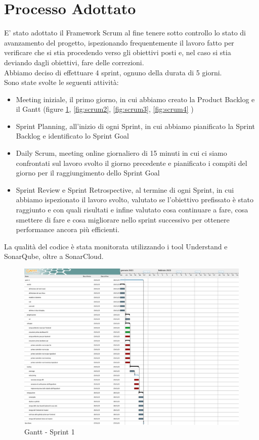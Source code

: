 \documentclass[a4paper,12pt]{report}
\begin{document}
\newpage
    	\section{Processo Adottato}	
	E' stato adottato il Framework Scrum al fine tenere sotto controllo lo stato di avanzamento del progetto, ispezionando frequentemente il lavoro fatto per verificare che si stia procedendo verso gli obiettivi posti e, nel caso si stia deviando dagli obiettivi, fare delle correzioni. \\
Abbiamo deciso di effettuare 4 sprint, ognuno della durata di 5 giorni.\\
Sono state svolte le seguenti attività:
	\begin{itemize}
		\item Meeting iniziale, il primo giorno, in cui abbiamo creato la Product Backlog e il Gantt (figure \ref{fig:scrum1}, \ref{fig:scrum2}, \ref{fig:scrum3}, \ref{fig:scrum4} )
		\item	Sprint Planning, all’inizio di ogni Sprint, in cui abbiamo pianificato la Sprint Backlog e identificato lo Sprint Goal
		\item Daily Scrum, meeting online giornaliero di 15 minuti in cui ci siamo confrontati sul lavoro svolto il giorno precedente e pianificato i compiti del giorno per il raggiungimento dello Sprint Goal
		\item Sprint Review e Sprint Retrospective, al termine di ogni Sprint, in cui abbiamo ispezionato il lavoro svolto, valutato se l’obiettivo prefissato è stato raggiunto e con quali risultati e infine valutato cosa continuare a fare, cosa smettere di fare e cosa migliorare nello sprint successivo per ottenere performance ancora più efficienti.
	\end{itemize}
La qualità del codice è stata monitorata utilizzando i tool Understand e SonarQube, oltre a SonarCloud.	

	\begin{figure}[!h]
		\centering
		\includegraphics[width=0.9\linewidth]{image/scrum1.png}
		\caption{Gantt - Sprint 1}\label{fig:scrum1}
	\end{figure}
\end{document}
